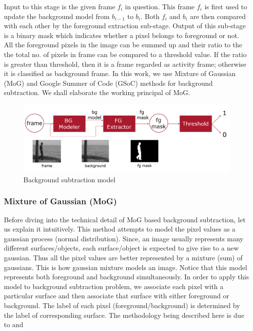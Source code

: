 Input to this stage is the given frame $f_i$ in question. This frame $f_i$ is first used to update the background model from $b_{i-1}$ to $b_i$. Both $f_i$ and $b_i$ are then compared with each other by the foreground extraction sub-stage. Output of this sub-stage is a binary mask which indicates whether a pixel belongs to foreground or not. All the foreground pixels in the image can be summed up and their ratio to the the total no. of pixels in frame can be compared to a threshold value. If the ratio is greater than threshold, then it is a frame regarded as activity frame; otherwise it is classified as background frame. In this work, we use Mixture of Gaussian (MoG) and Google Summer of Code (GSoC) methods for background subtraction. We shall elaborate the working principal of MoG. 
\begin{figure}
    \centering
    \includegraphics[width=\linewidth]{images/background-subtraction-model.PNG}
    \caption{Background subtraction model}
    \label{fig:background-subtraction-model}
\end{figure}

\subsubsection{Mixture of Gaussian (MoG)}
Before diving into the technical detail of MoG based background subtraction, let us explain it intuitively. This method attempts to model the pixel values as a gaussian process (normal distribution). Since, an image usually represents many different surfaces/objects, each surface/object is expected to give rise to a new gaussian. Thus all the pixel values are better represented by a mixture (sum) of gaussians. This is how gaussian mixture models an image. Notice that this model represents both foreground and background simultaneously. In order to apply this model to background subtraction problem, we associate each pixel with a particular surface and then associate that surface with either foreground or background. The label of each pixel (foreground/background) is determined by the label of corresponding surface. The methodology being described here is due to \cite{stauffer1999adaptive} and \cite{power2002understanding}

